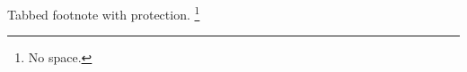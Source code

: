 \documentclass{article}
\begin{document}
Tabbed footnote with protection.%
	\footnote{No space.}
\end{document}
